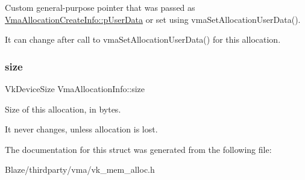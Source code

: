 Custom general-\/purpose pointer that was passed as \hyperlink{structVmaAllocationCreateInfo_a8259e85c272683434f4abb4ddddffe19}{Vma\+Allocation\+Create\+Info\+::p\+User\+Data} or set using vma\+Set\+Allocation\+User\+Data(). 

It can change after call to vma\+Set\+Allocation\+User\+Data() for this allocation. \mbox{\label{structVmaAllocationInfo_aac76d113a6a5ccbb09fea00fb25fd18f}} 
\subsubsection{\texorpdfstring{size}{size}}
{\footnotesize\ttfamily Vk\+Device\+Size Vma\+Allocation\+Info\+::size}



Size of this allocation, in bytes. 

It never changes, unless allocation is lost. 

The documentation for this struct was generated from the following file\+:\begin{DoxyCompactItemize}
\item 
Blaze/thirdparty/vma/vk\+\_\+mem\+\_\+alloc.\+h\end{DoxyCompactItemize}
